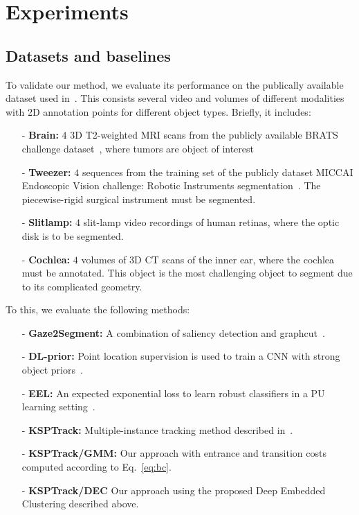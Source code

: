 \section{Experiments}
\label{sec:experiments}

\subsection{Datasets and baselines}
\label{sec:data}
To validate our method, we evaluate its performance on the publically available dataset used in~\cite{lejeune18}. This consists several video and volumes of different modalities with 2D annotation points for different object types. Briefly, it includes:
\begin{itemize}
\item[-]{\bf{Brain:}} $4$ 3D T2-weighted MRI scans from the publicly available BRATS challenge dataset~\cite{menze15}, where tumors are object of interest
\item[-]{\bf{Tweezer:}} $4$ sequences from the training set of the publicly dataset MICCAI Endoscopic Vision challenge: Robotic Instruments segmentation~\cite{endochal}. The piecewise-rigid surgical instrument must be segmented.
  
\item[-]{\bf{Slitlamp:}} $4$ slit-lamp video recordings of human retinas, where the optic disk is to be segmented. 

\item[-]{\bf{Cochlea:}} $4$ volumes of 3D CT scans of the inner ear, where the cochlea must be annotated. This object is the most challenging object to segment due to its complicated geometry. 
\end{itemize}

To this, we evaluate the following methods:
\begin{itemize}
\item[-]{\bf Gaze2Segment:} A combination of saliency detection and graphcut~\cite{khosravan16}. 
\item[-]{\bf DL-prior:} Point location supervision is used to train a CNN with strong object priors~\cite{bearman16}.
\item[-]{\bf EEL:} An expected exponential loss to learn robust classifiers in a PU learning setting~\cite{lejeune17}. 
\item[-]{\bf KSPTrack:} Multiple-instance tracking method described in~\cite{lejeune18}. 
\item[-]{\bf KSPTrack/GMM:} Our approach with entrance and transition costs computed according to Eq.~\eqref{eq:bc}.
\item[-]{\bf KSPTrack/DEC} Our approach using the proposed Deep Embedded Clustering described above.
\end{itemize}

